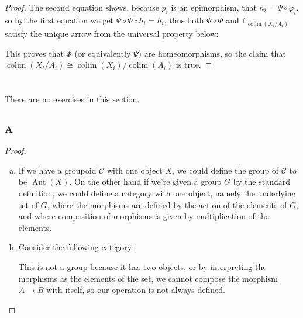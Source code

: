 \documentclass{article}
\DeclareMathOperator{\colim}{colim}
\DeclareMathOperator{\Aut}{Aut}
\newcommand{\altid}{\mathds{1}}
\begin{document}
\begin{proof}
    The second equation shows, because $p_i$ is an epimorphism, that $h_i=\Psi \circ \varphi_i$, so by the first equation we get $\Psi \circ \Phi\circ h_i=h_i$, thus both $\Psi \circ \Phi$ and $\altid_{\colim(X_i/A_i)}$ satisfy the unique arrow from the universal property below:
    \begin{center}
    \end{center}
    This proves that $\Phi$ (or equivalently $\Psi$) are homeomorphisms, so the claim that $\colim (X_i/A_i)\cong \colim (X_i)/\colim(A_i)$ is true.
    \end{proof}
\section{}
\subsection{}
There are no exercises in this section.
\subsection{}
\subsubsection{A}\label{1.2.A}
\begin{proof}
\begin{enumerate}[(a)]
    \item If we have a groupoid $\mathscr{C}$ with one object $X$, we could define the group of $\mathcal{C}$ to be $\Aut(X)$. On the other hand if we're given a group $G$ by the standard definition, we could define a category with one object, namely the underlying set of $G$, where the morphisms are defined by the action of the elements of $G$, and where composition of morphisms is given by multiplication of the elements.
    \item Consider the following category:
    \begin{center}
    \end{center}
    This is not a group because it has two objects, or by interpreting the morphisms as the elements of the set, we cannot compose the morphism $A\to B$ with itself, so our operation is not always defined.
\end{enumerate}
\end{proof}
\end{document}
